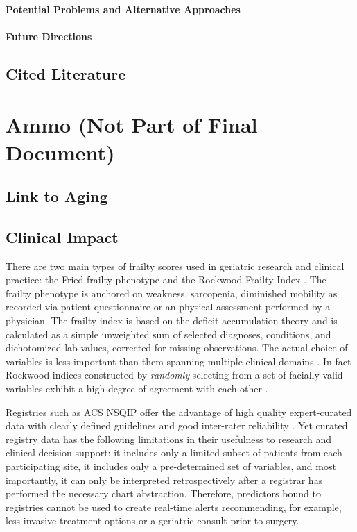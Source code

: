 \paragraph{Potential Problems and Alternative
      Approaches}\label{potential-problems-and-alternative-approaches}

\paragraph{Future Directions}\label{future-directions} 
    
\subsection{Cited Literature}\label{cited-literature}


\section{Ammo (Not Part of Final Document)}\label{ammo}

\subsection{Link to Aging}\label{link-to-aging}

\subsection{Clinical Impact}\label{clinical-impact}
There are two main types of frailty scores used in geriatric research and clinical practice: the Fried frailty phenotype \cite{Fried_2001} and the Rockwood Frailty Index \cite{Mitnitski_2001}. The frailty phenotype is anchored on weakness, sarcopenia, diminished mobility as recorded via patient questionnaire or an physical assessment performed by a physician. The frailty index is based on the deficit accumulation theory and is calculated as a simple unweighted sum of selected diagnoses, conditions, and dichotomized lab values, corrected for missing observations. The actual choice of variables is less important than them spanning multiple clinical domains \cite{Searle_2008}. In fact Rockwood indices constructed by \textit{randomly} selecting from a set of facially valid variables exhibit a high degree of agreement with each other \cite{Mitnitski_2001}.

 Registries such as ACS NSQIP offer the advantage of high quality expert-curated data with clearly defined guidelines and good inter-rater reliability \cite{Shiloach_2010}. Yet curated registry data has the following limitations in their usefulness to research and clinical decision support: it includes only a limited subset of patients from each participating site, it includes only a pre-determined set of variables, and most importantly, it can only be interpreted retrospectively after a registrar has performed the necessary chart abstraction. Therefore, predictors bound to registries cannot be used to create real-time alerts recommending, for example, less invasive treatment options or a geriatric consult prior to surgery.

